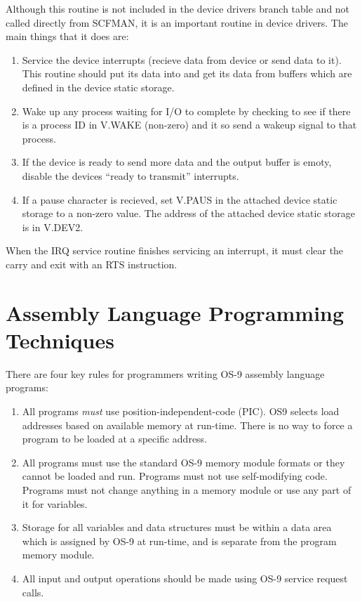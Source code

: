 \documentclass[
]{article}
\begin{document}
Although this routine is not included in the device drivers branch table
and not called directly from SCFMAN, it is an important routine in
device drivers. The main things that it does are:

\begin{enumerate}
\def\labelenumi{\arabic{enumi}.}
\item
  Service the device interrupts (recieve data from device or send data
  to it). This routine should put its data into and get its data from
  buffers which are defined in the device static storage.
\item
  Wake up any process waiting for I/O to complete by checking to see if
  there is a process ID in V.WAKE (non-zero) and it so send a wakeup
  signal to that process.
\item
  If the device is ready to send more data and the output buffer is
  emoty, disable the device\textquotesingle s ``ready to transmit''
  interrupts.
\item
  If a pause character is recieved, set V.PAUS in the attached device
  static storage to a non-zero value. The address of the attached device
  static storage is in V.DEV2.
\end{enumerate}

When the IRQ service routine finishes servicing an interrupt, it must
clear the carry and exit with an RTS instruction.

\section{Assembly Language Programming Techniques}

There are four key rules for programmers writing OS-9 assembly language
programs:

\begin{enumerate}
\def\labelenumi{\arabic{enumi}.}
\item
  All programs \emph{must} use position-independent-code (PIC). OS9
  selects load addresses based on available memory at run-time. There is
  no way to force a program to be loaded at a specific address.
\item
  All programs must use the standard OS-9 memory module formats or they
  cannot be loaded and run. Programs must not use self-modifying code.
  Programs must not change anything in a memory module or use any part
  of it for variables.
\item
  Storage for all variables and data structures must be within a data
  area which is assigned by OS-9 at run-time, and is separate from the
  program memory module.
\item
  All input and output operations should be made using OS-9 service
  request calls.
\end{enumerate}
\end{document}

